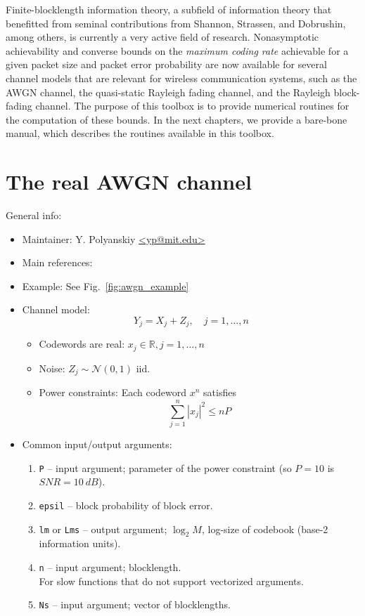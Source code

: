\documentclass[a4paper,11p]{memoir}
\def\matn{\mathcal{N}}
\begin{document}
Finite-blocklength information theory, a subfield of information theory that benefitted from seminal contributions from Shannon, Strassen, and Dobrushin, among others, is currently a very active field of research. 
Nonasymptotic achievability and converse bounds on the \emph{maximum coding rate} achievable for a given packet size and packet error probability are now available for several channel models that are relevant for wireless communication systems, such as the AWGN channel, the quasi-static Rayleigh fading channel, and the Rayleigh block-fading channel.
The purpose of this toolbox is to provide numerical routines for the computation of these bounds.
In the next chapters, we provide a bare-bone manual, which describes the routines available in this toolbox.



\chapter{The real AWGN channel}


General info:
\begin{itemize}
\item Maintainer: Y. Polyanskiy \url{<yp@mit.edu>}

\item Main references: \cite{PPV08}

\item Example: See Fig.~\ref{fig:awgn_example} 

\item Channel model:
	$$ Y_j = X_j + Z_j, \quad j=1,\ldots,n $$
	\begin{itemize}
	\item Codewords are real: $x_j \in \mathbb{R}, j=1,\ldots,n$
	\item Noise: $Z_j \sim \matn(0,1)$ iid.\\
	\item Power constraints: Each codeword $x^n$ satisfies
			$$ \sum_{j=1}^n |x_j|^2 \le n P $$
	\end{itemize}

\item Common input/output arguments:
\begin{enumerate}
\item \verb|P| -- input argument; parameter of the power constraint (so $P=10$ is $SNR=10~dB$).
\item \verb|epsil| -- block probability of block error.
\item \verb|lm| or \verb|Lms| -- output argument; $\log_2 M$, log-size of codebook (base-2 information units). 
\item \verb|n| -- input argument; blocklength.\\
		For slow functions that do not support vectorized arguments.
\item \verb|Ns| -- input argument; vector of blocklengths.
\end{enumerate}
\end{itemize}
\end{document}
